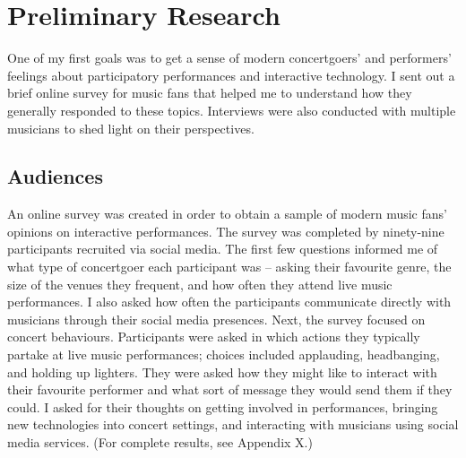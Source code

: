 \chapter{Preliminary Research}

One of my first goals was to get a sense of modern concertgoers' and performers' feelings about participatory performances and interactive technology. I sent out a brief online survey for music fans that helped me to understand how they generally responded to these topics. Interviews were also conducted with multiple musicians to shed light on their perspectives.

\section{Audiences}

An online survey was created in order to obtain a sample of modern music fans' opinions on interactive performances. The survey was completed by ninety-nine participants recruited via social media. The first few questions informed me of what type of concertgoer each participant was -- asking their favourite genre, the size of the venues they frequent, and how often they attend live music performances. I also asked how often the participants communicate directly with musicians through their social media presences. Next, the survey focused on concert behaviours. Participants were asked in which actions they typically partake at live music performances; choices included applauding, headbanging, and holding up lighters. They were asked how they might like to interact with their favourite performer and what sort of message they would send them if they could. I asked for their thoughts on getting involved in performances, bringing new technologies into concert settings, and interacting with musicians using social media services. (For complete results, see Appendix X.)

